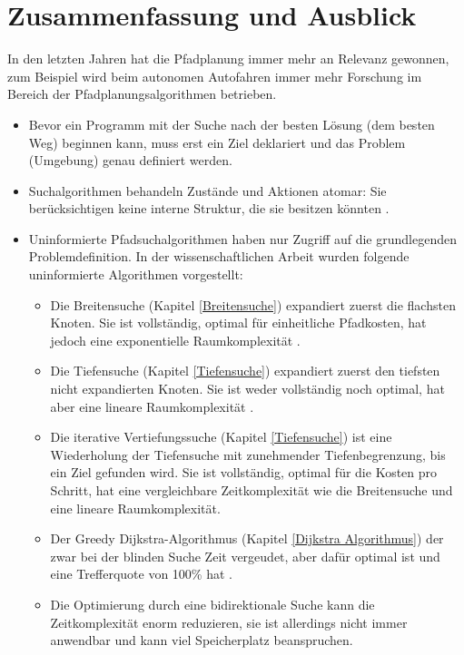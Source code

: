 \chapter{Zusammenfassung und Ausblick}
\label{Zusammenfassung und Ausblick}
In den letzten Jahren hat die Pfadplanung immer mehr an Relevanz gewonnen, zum Beispiel wird beim autonomen Autofahren immer mehr Forschung 
im Bereich der Pfadplanungsalgorithmen betrieben. \cite{Karur:21}
\noindent \\
\begin{itemize}
    \item Bevor ein Programm mit der Suche nach der besten Lösung (dem besten Weg) beginnen kann, muss erst ein Ziel deklariert und das Problem (Umgebung) genau definiert werden.
    \item Suchalgorithmen behandeln Zustände und Aktionen atomar: Sie berücksichtigen keine interne Struktur, die sie besitzen könnten \cite[108,109]{Russell:10}.
    \item Uninformierte Pfadsuchalgorithmen haben nur Zugriff auf die grundlegenden Problemdefinition. In der wissenschaftlichen Arbeit wurden folgende uninformierte Algorithmen vorgestellt:
    \begin{itemize}
        \item Die Breitensuche (Kapitel \ref{Breitensuche}) expandiert zuerst die flachsten Knoten. Sie ist vollständig, optimal für einheitliche Pfadkosten, hat jedoch eine exponentielle Raumkomplexität \cite[81]{Russell:10}.
        \item Die Tiefensuche (Kapitel \ref{Tiefensuche}) expandiert zuerst den tiefsten nicht expandierten Knoten. Sie ist weder vollständig noch optimal, hat aber eine lineare Raumkomplexität \cite[85,86]{Russell:10}.
        \item Die iterative Vertiefungssuche (Kapitel \ref{Tiefensuche}) ist eine Wiederholung der Tiefensuche mit zunehmender Tiefenbegrenzung, bis ein Ziel gefunden wird. Sie ist vollständig, optimal für die Kosten pro Schritt, hat eine vergleichbare Zeitkomplexität wie die Breitensuche und eine lineare Raumkomplexität\cite[85,86]{Russell:10}.
        \item Der Greedy Dijkstra-Algorithmus (Kapitel \ref{Dijkstra Algorithmus}) der zwar bei der blinden Suche Zeit vergeudet, aber dafür optimal ist und eine Trefferquote von 100\% hat \cite{Karur:21}.
        \item Die Optimierung durch eine bidirektionale Suche kann die Zeitkomplexität enorm reduzieren, sie ist allerdings nicht immer anwendbar und kann viel Speicherplatz beanspruchen.\\\\

\end{itemize}
\end{itemize}
